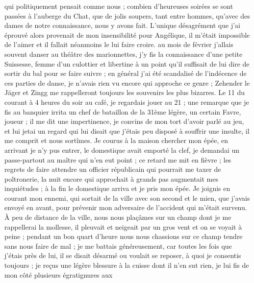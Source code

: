 \documentclass[12pt]{article}
\begin{document}
 qui politiquement pensait comme nous ; combien
d’heureuses soirées se sont passées à l’auberge du Chat, que de jolis soupers, tant entre hommes,
qu’avec des dames de notre connaissance, nous y avons fait. L’unique désagrément que j’ai éprouvé
alors provenait de mon insensibilité pour Angélique, il m’était impossible de l’aimer et il fallait
néanmoins le lui faire croire. au mois de février j’allais souvent danser au théâtre des
marionnettes, j’y fis la connaissance d’une petite Suissesse, femme d’un culottier et libertine à un
point qu’il suffisait de lui dire de sortir du bal pour se faire suivre ; en général j’ai été
scandalisé de l’indécence de ces parties de danse, je n’avais rien vu encore qui approche ce genre ;
Zehender le Jäger et Zingg me rappelleront toujours les souvenirs les plus bizarres. Le 11 du
courant à 4 heures du soir au café, je regardais jouer au 21 ; une remarque que je fis au banquier
irrita un chef de bataillon de la 31ème légère, un certain Favre, joueur ; il me dit une
impertinence, je convins de mon tort d’avoir parlé au jeu, et lui jetai un regard qui lui disait que
j’étais peu disposé à souffrir une insulte, il me comprit et nous sortîmes. Je courus à la maison
chercher mon épée, en arrivant je n’y pus entrer, le domestique avait emporté la clef, je demandai
un passe-partout au maître qui n’en eut point ; ce retard me mit en fièvre ; les regrets de faire
attendre un officier républicain qui pourrait me taxer de poltronerie, la nuit encore qui approchait
à grands pas augmentait mes inquiétudes ; à la fin le domestique arriva et je pris mon épée. Je
joignis en courant mon ennemi, qui sortait de la ville avec son second et le mien, que j’avais
envoyé en avant, pour prévenir mon adversaire de l’accident qui m’était survenu. À peu de distance
de la ville, nous nous plaçâmes sur un champ dont je me rappellerai la mollesse, il pleuvait et
neigeait par un gros vent et on se voyait à peine ; pendant un bon quart d’heure nous nous chassions
sur ce champ tendre sans nous faire de mal ; je me battais généreusement, car toutes les fois que
j’étais près de lui, il se disait désarmé ou voulait se reposer, à quoi je consentis toujours ; je
reçus une légère blessure à la cuisse dont il n’en sut rien, je lui fis de mon côté plusieurs
égratignures aux
\end{document}
